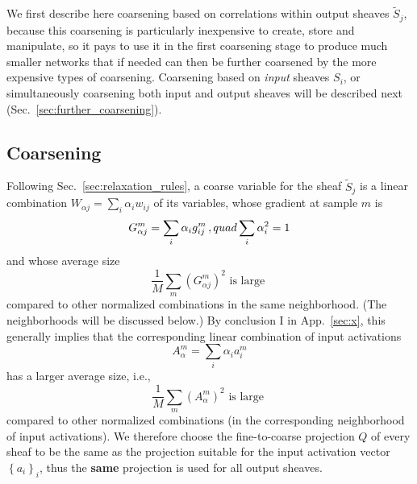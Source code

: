 \documentclass{article} %
\begin{document}

We first describe here coarsening based on correlations within output sheaves $\tilde{S}_j$, because this coarsening is particularly inexpensive to create, store and manipulate, so it pays to use it in the first coarsening stage to produce much smaller networks that if needed can then be further coarsened by the more expensive types of coarsening. Coarsening based on {\it input} sheaves $S_i$, or simultaneously coarsening both input and output sheaves will be described next (Sec.~\ref{sec:further_coarsening}).

\subsection{Coarsening}
\label{sec:coarsening}
Following Sec.~\ref{sec:relaxation_rules}, a coarse variable for the sheaf $\tilde{S}_j$ is a linear combination $W_{\alpha j} = \sum_i \alpha_i w_{ij}$ of its variables, whose gradient at sample $m$ is
$$ G^m_{\alpha j} = \sum_i \alpha_i g^m_{ij}\,, \\quad \sum_i \alpha_i^2 = 1 $$
and whose average size
\begin{equation}
    \frac{1}{M} \sum_m \left(G^m_{\alpha j} \right)^2 \text{ is large }
    \label{parameter_large_avg_size}
\end{equation}
compared to other normalized combinations in the same neighborhood. (The neighborhoods will be discussed below.) By conclusion I in App.~\ref{sec:x}, this generally implies that the corresponding linear combination of input activations
$$A^m_{\alpha} = \sum_i \alpha_i a^m_i$$
has a larger average size, i.e.,
\begin{equation}
    \frac{1}{M} \sum_m \left(A^m_{\alpha} \right)^2 \text{ is large }
    \label{activation_large_avg_size}
\end{equation}
compared to other normalized combinations (in the corresponding neighborhood of input activations). We therefore choose the fine-to-coarse projection $Q$ of every sheaf to be the same as the projection suitable for the input activation vector $\left\{a_i\right\}_i$, thus the \textbf{same} projection is used for all output sheaves.
\end{document}
